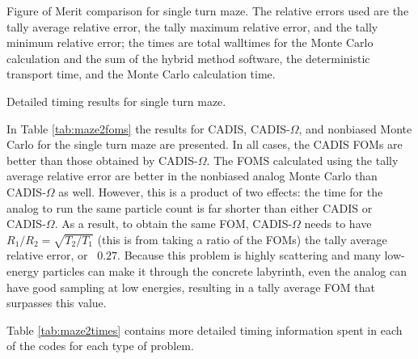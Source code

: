\begin{table}[h!]
  \centering
  
  \caption[Figure of Merit comparison for single turn maze.]{Figure of Merit
    comparison for single turn maze.
    The relative errors used are the tally average relative error, the tally maximum relative
  error, and the tally minimum relative error; the times are total walltimes for
  the Monte Carlo calculation and the sum of the hybrid method software, the
  deterministic transport time, and the Monte Carlo calculation time.}
  \label{tab:maze2foms}
\end{table}

\begin{table}[h!]
  \centering
  
  \caption[Detailed timing results for single turn maze.]
  {Detailed timing results for single turn maze.}
  \label{tab:maze2times}
\end{table}

In Table \ref{tab:maze2foms} the results for CADIS, CADIS-$\Omega$, and
nonbiased Monte Carlo for the single turn maze are presented. In all cases, the
CADIS FOMs are better than those obtained by CADIS-$\Omega$. The FOMS
calculated using the tally average relative error are better in the nonbiased
analog Monte Carlo than CADIS-$\Omega$ as well. However, this is a product of
two effects: the time for the analog to run the same particle count is far
shorter than either CADIS or CADIS-$\Omega$. As a result, to obtain the same
FOM, CADIS-$\Omega$ needs to have $R_1/R_2 = \sqrt{T_2/T_1}$ (this is from
taking a ratio of the FOMs) the tally average
relative error, or ~$0.27$. Because this problem is highly scattering and many
low-energy particles can make it through the concrete labyrinth, even the analog
can have good sampling at low energies, resulting in a tally average FOM that
surpasses this value.

Table \ref{tab:maze2times} contains more detailed timing information spent in
each of the codes for each type of problem.

